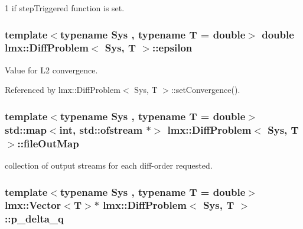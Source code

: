 1 if step\-Triggered function is set. 

\hypertarget{classlmx_1_1DiffProblem_aeb9570709f636d15d2636cbe5d6a8f5b}{
\subsubsection[{epsilon}]{\setlength{\rightskip}{0pt plus 5cm}template$<$typename Sys , typename T  = double$>$ double {\bf lmx\-::\-Diff\-Problem}$<$ Sys, T $>$\-::epsilon\hspace{0.3cm}{\ttfamily [protected]}}}\label{classlmx_1_1DiffProblem_aeb9570709f636d15d2636cbe5d6a8f5b}


Value for L2 convergence. 



Referenced by lmx\-::\-Diff\-Problem$<$ Sys, T $>$\-::set\-Convergence().

\hypertarget{classlmx_1_1DiffProblem_aed830db025433747c8190c8a77db75d5}{
\subsubsection[{file\-Out\-Map}]{\setlength{\rightskip}{0pt plus 5cm}template$<$typename Sys , typename T  = double$>$ std\-::map$<$int, std\-::ofstream $\ast$$>$ {\bf lmx\-::\-Diff\-Problem}$<$ Sys, T $>$\-::file\-Out\-Map\hspace{0.3cm}{\ttfamily [protected]}}}\label{classlmx_1_1DiffProblem_aed830db025433747c8190c8a77db75d5}


collection of output streams for each diff-\/order requested. 

\hypertarget{classlmx_1_1DiffProblem_a219c62e356b88d5e2680a476f1c3f427}{
\subsubsection[{p\-\_\-delta\-\_\-q}]{\setlength{\rightskip}{0pt plus 5cm}template$<$typename Sys , typename T  = double$>$ {\bf lmx\-::\-Vector}$<$T$>$$\ast$ {\bf lmx\-::\-Diff\-Problem}$<$ Sys, T $>$\-::p\-\_\-delta\-\_\-q\hspace{0.3cm}{\ttfamily [protected]}}}\label{classlmx_1_1DiffProblem_a219c62e356b88d5e2680a476f1c3f427}


